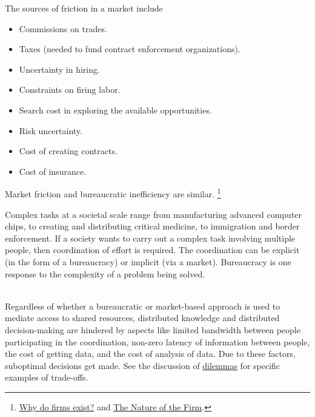 The sources of friction in a market include
\begin{itemize}
    \item Commissions on trades.
    \item Taxes (needed to fund contract enforcement organizations).
    \item Uncertainty in hiring.
    \item Constraints on firing labor.
    \item Search cost in exploring the available opportunities.
    \item Risk uncertainty.
    \item Cost of creating contracts.
    \item Cost of insurance.
\end{itemize}
Market friction and bureaucratic inefficiency are similar. \footnote{  \href{http://www.economist.com/node/17730360}{Why do firms exist?} and \href{https://en.wikipedia.org/wiki/The_Nature_of_the_Firm}{The Nature of the Firm}.
}

Complex tasks at a societal scale range from manufacturing advanced computer chips, to creating and distributing critical medicine, to immigration and border enforcement. 
If a society wants to carry out a complex task involving multiple people, then coordination of effort is required. The coordination can be explicit (in the form of a bureaucracy) or implicit (via a market).  Bureaucracy is one response to the complexity of a problem being solved.


\ \\

Regardless of whether a bureaucratic or market-based approach is used to mediate access to \glspl{shared resource}, 
distributed knowledge and distributed decision-making are hindered by aspects like
limited bandwidth between people participating in the coordination,
non-zero latency of information between people,
the cost of getting data,
and
the cost of analysis of data.
Due to these factors, suboptimal decisions get made. See  %
the discussion of 
\hyperref[sec:dilemma-trilemma]{dilemmas}
for specific examples of trade-offs.

